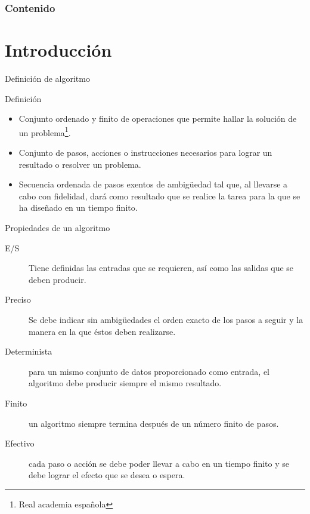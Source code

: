 
\begin{frame}
    \frametitle{Contenido}
    \tableofcontents
\end{frame}

\section{Introducción}

\begin{frame}[c]{Definición de algoritmo}
  \begin{block}{Definición}
    \begin{itemize}
      \item Conjunto ordenado y finito de operaciones que permite hallar
            la solución de un problema\footnote{Real academia española}.
      \pausa
      \item Conjunto de pasos, acciones o instrucciones necesarios para
            lograr un resultado o resolver un problema.
      \pausa
      \item Secuencia ordenada de pasos exentos de ambigüedad tal que, al
            llevarse a cabo con fidelidad, dará como resultado que se realice
            la tarea para la que se ha diseñado en un tiempo finito.
    \end{itemize}
    \pausa
    \begin{center}
    \end{center}
  \end{block}
\end{frame}

\begin{frame}[c]{Propiedades de un algoritmo}
  \begin{description}
    \item[E/S] Tiene definidas las entradas que se requieren, así como las
      salidas que se deben producir.
    \pausa
    \item[Preciso] Se debe indicar sin ambigüedades el orden exacto de los
      pasos a seguir y la manera en la que éstos deben realizarse.
    \pausa
    \item[Determinista] para un mismo conjunto de datos proporcionado como
      entrada, el algoritmo debe producir siempre el mismo resultado.
    \pausa
    \item[Finito] un algoritmo siempre termina después de un número finito
      de pasos.
    \pausa
    \item[Efectivo] cada paso o acción se debe poder llevar a cabo en un
      tiempo finito y se debe lograr el efecto que se desea o espera.
  \end{description}
\end{frame}

